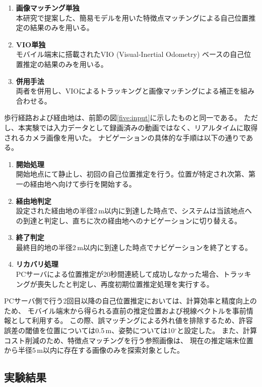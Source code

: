 \begin{enumerate}
    \item \textbf{画像マッチング単独} \\
    本研究で提案した、簡易モデルを用いた特徴点マッチングによる自己位置推定の結果のみを用いる。
    \item \textbf{VIO単独} \\
    モバイル端末に搭載されたVIO (Visual-Inertial Odometry) ベースの自己位置推定の結果のみを用いる。
    \item \textbf{併用手法} \\
    両者を併用し、VIOによるトラッキングと画像マッチングによる補正を組み合わせる。
\end{enumerate}

歩行経路および経由地は、前節の図\ref{five:input}に示したものと同一である。
ただし、本実験では入力データとして録画済みの動画ではなく、リアルタイムに取得されるカメラ画像を用いた。
ナビゲーションの具体的な手順は以下の通りである。

\begin{enumerate}
    \item \textbf{開始処理} \\
    開始地点にて静止し、初回の自己位置推定を行う。位置が特定され次第、第一の経由地へ向けて歩行を開始する。
    \item \textbf{経由地判定} \\
    設定された経由地の半径2\,m以内に到達した時点で、システムは当該地点への到達と判定し、直ちに次の経由地へのナビゲーションに切り替える。
    \item \textbf{終了判定} \\
    最終目的地の半径2\,m以内に到達した時点でナビゲーションを終了とする。
    \item \textbf{リカバリ処理} \\
    PCサーバによる位置推定が20秒間連続して成功しなかった場合、トラッキングが喪失したと判定し、再度初期位置推定処理を実行する。
\end{enumerate}

PCサーバ側で行う2回目以降の自己位置推定においては、計算効率と精度向上のため、
モバイル端末から得られる直前の推定位置および視線ベクトルを事前情報として利用する。
この際、誤マッチングによる外れ値を排除するため、許容誤差の閾値を位置については0.5\,m、姿勢については10$^{\circ}$と設定した。
また、計算コスト削減のため、特徴点マッチングを行う参照画像は、
現在の推定端末位置から半径5\,m以内に存在する画像のみを探索対象とした。

\subsection{実験結果}

